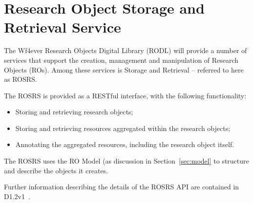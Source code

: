 \section{Research Object Storage and Retrieval Service}
\label{sec:rosrs}

The Wf4ever Research Objects Digital Library (RODL) will provide a number of services that support the creation, management and manipulation of Research Objects (ROs). Among these services is Storage and Retrieval -- referred to here as ROSRS. 

The ROSRS is provided as a RESTful interface, with the following functionality:

\begin{itemize}
\item Storing and retrieving research objects;
\item Storing and retrieving resources aggregated within the research objects;
\item Annotating the aggregated resources, including the research object itself. 
\end{itemize}

The ROSRS uses the RO Model (as discussion in Section~\ref{sec:model} to structure and describe the objects it creates. 

Further information describing the details of the ROSRS API are contained in D1.2v1~\cite{D1.4v1}.


